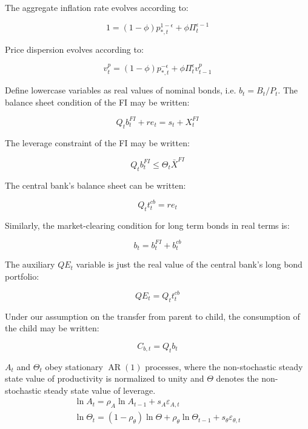 \documentclass[10pt]{article}
\begin{document}
The aggregate inflation rate evolves according to:

\begin{equation*}
1=(1-\phi) p_{*, t}^{1-\epsilon}+\phi \Pi_{t}^{\epsilon-1} \tag{A.4}
\end{equation*}

Price dispersion evolves according to:

\begin{equation*}
v_{t}^{p}=(1-\phi) p_{*, t}^{-\epsilon}+\phi \Pi_{t}^{\epsilon} v_{t-1}^{p} \tag{A.5}
\end{equation*}

Define lowercase variables as real values of nominal bonds, i.e. $b_{t}=B_{t} / P_{t}$. The balance sheet condition of the FI may be written:

\begin{equation*}
Q_{t} b_{t}^{F I}+r e_{t}=s_{t}+X_{t}^{F I} \tag{A.6}
\end{equation*}

The leverage constraint of the FI may be written:

\begin{equation*}
Q_{t} b_{t}^{F I} \leq \Theta_{t} \bar{X}^{F I} \tag{A.7}
\end{equation*}

The central bank's balance sheet can be written:

\begin{equation*}
Q_{t} t_{t}^{c b}=r e_{t} \tag{A.8}
\end{equation*}

Similarly, the market-clearing condition for long term bonds in real terms is:

\begin{equation*}
b_{t}=b_{t}^{F I}+b_{t}^{c b} \tag{A.9}
\end{equation*}

The auxiliary $Q E_{t}$ variable is just the real value of the central bank's long bond portfolio:

\begin{equation*}
Q E_{t}=Q_{t} t_{t}^{c b} \tag{A.10}
\end{equation*}

Under our assumption on the transfer from parent to child, the consumption of the child may be written:

\begin{equation*}
C_{b, t}=Q_{t} b_{t} \tag{A.11}
\end{equation*}

$A_{t}$ and $\Theta_{t}$ obey stationary $\operatorname{AR}(1)$ processes, where the non-stochastic steady state value of productivity is normalized to unity and $\Theta$ denotes the non-stochastic steady state value of leverage.\\
\begin{gather*}
\ln A_{t}=\rho_{A} \ln A_{t-1}+s_{A} \varepsilon_{A, t}  \tag{A.12}\\
\ln \Theta_{t}=\left(1-\rho_{\theta}\right) \ln \Theta+\rho_{\theta} \ln \Theta_{t-1}+s_{\theta} \varepsilon_{\theta, t} \tag{A.13}
\end{gather*}
\end{document}

